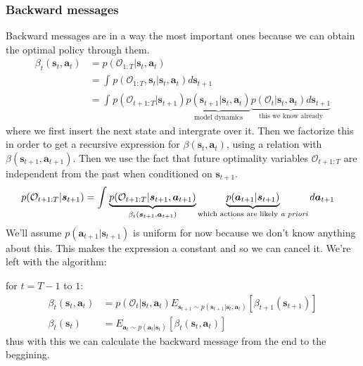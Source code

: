 \documentclass{report}
\begin{document}
\subsubsection{Backward messages}
Backward messages are in a way the most important ones because we can obtain the optimal policy through them.
\begin{align}
\beta_{ t } (\bm{s}_{t}, \bm{a}_{t} ) &= p (\mathcal{O}_{ 1:T }|\bm{s}_{t}, \bm{a}_{t})\\
&= \int_{}^{} p (\mathcal{O}_{ 1:T }, \bm{s}_{t} | \bm{s}_{t}, \bm{a}_{t}) d\bm{s}_{t+1}\\
&= \int_{}^{} p (\mathcal{O}_{ t+1:T }| \bm{s}_{t+1}) 
\underbrace{p (\bm{s}_{t+1}| \bm{s}_{t}, \bm{a}_{t}) }_{ \text{model dynamics} }
\underbrace{p (\mathcal{O}_{ t }| \bm{s}_{t}, \bm{a}_{t}) d\bm{s}_{t+1}}_{ \text{this we know already} }
\end{align}
where we first insert the next state and intergrate over it.
Then we factorize this in order to get a recursive expression for $ \beta (\bm{s}_{t}, \bm{a}_{t} )  $, using
a relation with $ \beta (\bm{s}_{t+1}, \bm{a}_{t+1} )  $.
Then we use the fact that future optimality variables $ \mathcal{O}_{ t+1:T }  $
are independent from the past when conditioned on $ \bm{s}_{t+1}  $.
\begin{align}
p (\mathcal{O}_{ t+1:T }|\bm{s}_{t+1}) &= \int_{}^{} 
\underbrace{p (\mathcal{O}_{ t+1:T }| \bm{s}_{t+1}, \bm{a}_{t+1}) }_{ \beta_{ t } (\bm{s}_{t+1}, \bm{a}_{t+1} ) }
\underbrace{p (\bm{a}_{t+1}| \bm{s}_{t+1} ) }_{ \text{which actions are likely \textit{a priori}} }
d \bm{a}_{t+1}
\end{align}
We'll assume $ p (\bm{a}_{t+1}| \bm{s}_{t+1} )  $ is uniform for now
because we don't know anything about this.
This makes the expression a constant and so we can cancel it.
We're left with the algorithm:

for $ t = T -1  $ to $ 1  $:
\begin{align}
\beta_{ t } (\bm{s}_{t}, \bm{a}_{t} ) &= p (\mathcal{O}_{ t } | \bm{s}_{t}, \bm{a}_{t}) 
E_{ \bm{s}_{t+1} \sim p (\bm{s}_{t+1} | \bm{s}_{t}, \bm{a}_{t}) } \left[ \beta_{ t+1 } (\bm{s}_{t+1}) \right] \\
\beta_{ t } (\bm{s}_{t}) &=
E_{ \bm{a}_{t} \sim p (\bm{a}_{t}| \bm{s}_{t} ) } \left[ \beta_{ t } (\bm{s}_{t}, \bm{a}_{t} ) \right] 
\end{align}
thus with this we can calculate the backward message from the end to the beggining.
\end{document}
